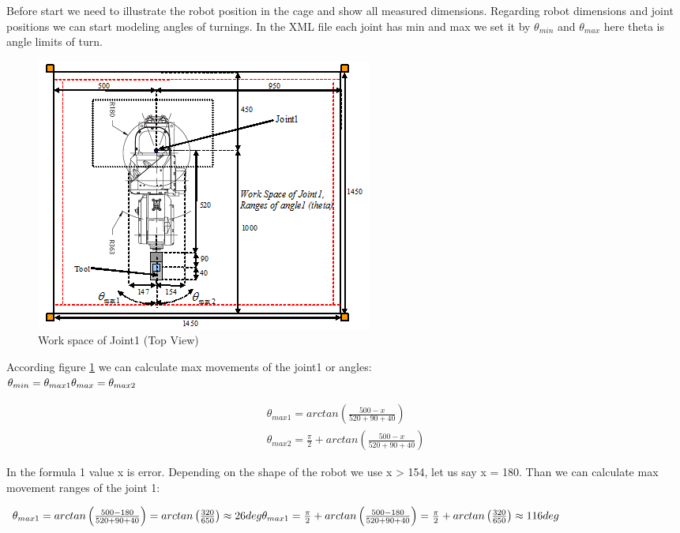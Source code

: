 Before start we need to illustrate the robot position in the cage and show all measured dimensions. Regarding robot dimensions and joint positions we can start modeling angles of turnings. In the XML file each joint has min and max we set it by $\theta _{min}$ and $\theta _{max}$ here theta is angle limits of turn.

\begin{figure}[H]
  \centering
  \includegraphics[scale= 1]{source/JointWorkspaceDimensions.png}
  \caption{Work space of Joint1 (Top View)}
  \label{fig:JointWorkspaceDimensions}
\end{figure}

According figure \ref{fig:JointWorkspaceDimensions} we can calculate max movements of the joint1 or angles: \\


$\theta _{min}=\theta _{max1}\\
\theta _{max}=\theta _{max2}$

\begin{align}
\theta _{max1}=arctan\left ( \frac{500-x}{520+90+40} \right ) \label{eq:eq0}\\
\theta _{max2}=\frac{\pi }{2}+arctan\left ( \frac{500-x}{520+90+40} \right )\label{eq:eq1}
\end{align}

In the formula 1 value x is error. Depending on the shape of the robot we use x > 154, let us say x = 180. Than we can calculate max movement ranges of the joint 1:

$\theta _{max1}=arctan\left ( \frac{500-180}{520+90+40} \right )=arctan\left ( \frac{320}{650} \right )\approx 26deg \\
\theta _{max1}=\frac{\pi }{2}+arctan\left ( \frac{500-180}{520+90+40} \right )=\frac{\pi }{2}+arctan\left ( \frac{320}{650} \right )\approx 116deg$\\


